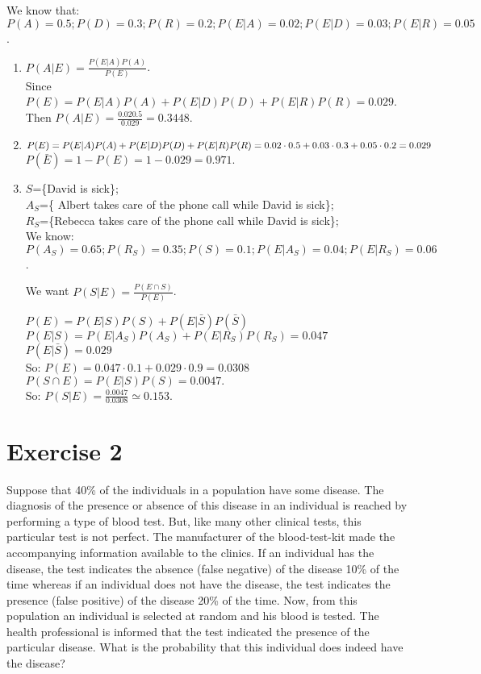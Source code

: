 \documentclass[12pt,thmsa]{article}\usepackage[]{graphicx}\usepackage[]{color}
\begin{document}
We know that: $P(A)=0.5; P(D)=0.3; P(R)=0.2; P(E \vert A)=0.02; P(E \vert D)=0.03; P(E \vert R)=0.05$.

\begin{enumerate}
  \item $P(A \vert E)= \frac{P(E\vert A) P(A)}{P(E)}$.  \\
  Since $P(E)=P(E \vert A) P(A)+ P(E \vert D) P(D)+ P(E \vert R) P(R)=0.029$. \\
  Then $P(A \vert E)=\frac{0.02 0.5}{0.029}=0.3448$.

  \item $P(E)=P(E \vert A)P(A)+P(E \vert D) P(D)+P(E \vert R) P(R)\\= 0.02\cdot0.5+0.03\cdot 0.3+0.05\cdot 0.2=0.029$\\
$P(\bar{E})=1-P(E)=1-0.029=0.971$.


  \item  $S$=\{David is sick\}; \\
$A_S$=\{ Albert takes care of the phone call while David is sick\}; \\
$R_S$=\{Rebecca takes care of the phone call while David is sick\}; \\

We know: $P(A_S)=0.65; P(R_S)=0.35; P(S)=0.1; P(E \vert A_S)=0.04; P(E \vert R_S)=0.06$.

We want $P(S \vert E)=  \frac{P(E \cap S)}{P(E)}$.

$P(E)=P(E \vert S)P(S)+P(E \vert \bar{S}) P(\bar{S})$\\
$P(E \vert S)=P(E \vert A_S) P(A_S) + P(E\vert R_S) P(R_S) =0.047$\\
$P(E \vert \bar{S})= 0.029$\\
So: $P(E)= 0.047 \cdot 0.1 + 0.029 \cdot 0.9= 0.0308$\\
$P(S \cap E) = P(E \vert S) P(S)= 0.0047.$\\
So: $P(S \vert E)= \frac{0.0047}{0.0308}\simeq 0.153$.

\end{enumerate}

\section*{Exercise 2}

Suppose that 40\% of the individuals in a population have some disease. The diagnosis of the presence or absence of this disease in an individual is reached by performing a type of blood test. But, like many other clinical tests, this particular test is not perfect. The manufacturer of the blood-test-kit made the accompanying information available to the clinics. If an individual has the disease, the test indicates the absence (false negative) of the disease 10\% of the time whereas if an individual does not have the disease, the test indicates the presence (false positive) of the disease 20\% of the time. Now, from this population an individual is selected at random and his blood is tested. The health professional is informed that the test indicated the presence of the particular disease. What is the probability that this individual does indeed have the disease?
\end{document}
